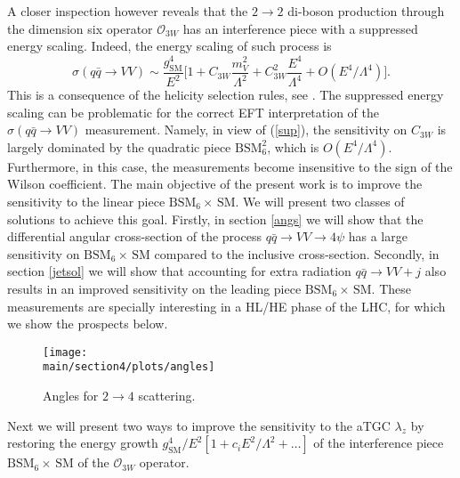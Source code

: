 A closer inspection however reveals that the  $2\to 2$ di-boson production through the dimension six operator $\mathcal{O}_{3W}$  has an interference piece with a suppressed energy scaling. 
Indeed, the energy scaling of such process is  
\begin{equation}
\sigma ( q\bar q \rightarrow VV ) \sim \frac{g_\text{SM}^4}{E^2}\bigg[  1 +  C_{3W}\frac{m_V^2}{\Lambda^2}  +C_{3W}^2 \frac{E^4}{\Lambda^4}  + O(E^4/\Lambda^4) \bigg]. \label{sup}
\end{equation} 
This is a consequence of the  helicity selection rules, see    
\cite{Dixon:1993xd,Azatov:2016sqh,Azatov:2017kzw,Panico:2017frx}.
The suppressed energy scaling can be problematic for the correct EFT  
interpretation of the $\sigma(q\bar q \to V V)$ measurement. 
Namely, in view of (\ref{sup}), the sensitivity on $C_{3W}$ is largely 
dominated by the quadratic piece $\text{BSM}_6^2$, which is 
$O(E^4/\Lambda^4)$. 
 Furthermore, in this case, the measurements become insensitive to the sign of the Wilson coefficient.
The main objective of the present work is to 
improve the sensitivity to the linear piece $\text{BSM$_6\times\,$SM}$.
We will present two classes of solutions to achieve this goal. Firstly, in section \ref{angs} we  will show that the differential angular cross-section 
 of the process $q\bar q \rightarrow VV\rightarrow 4\psi$ has a large sensitivity on $\text{BSM$_6\times\,$SM}$ compared to the inclusive cross-section.   Secondly, in section \ref{jetsol} we will show that accounting for extra radiation $q\bar q \rightarrow VV+j$ also results in an improved sensitivity on the leading piece $\text{BSM$_6\times\,$SM}$.
These measurements are specially interesting in a HL/HE phase of the LHC, for which we show the prospects below.%



\begin{figure}[t]
\begin{center}
\texttt{[image: \\main/section4/plots/angles]}
\end{center}
\vspace{-.3cm}
\caption{Angles for $2\to 4$ scattering. \label{fig:ang}}
\end{figure}

Next we will present two ways to  improve the sensitivity to the aTGC $\lambda_z$ by restoring the energy growth
$g_\text{SM}^4/E^2\left[1+c_i E^2/\Lambda^2+  \dots\right]$ of the interference piece $\text{BSM$_6\times\,$SM}$ of the  $\mathcal{O}_{3W}$ operator.\\

